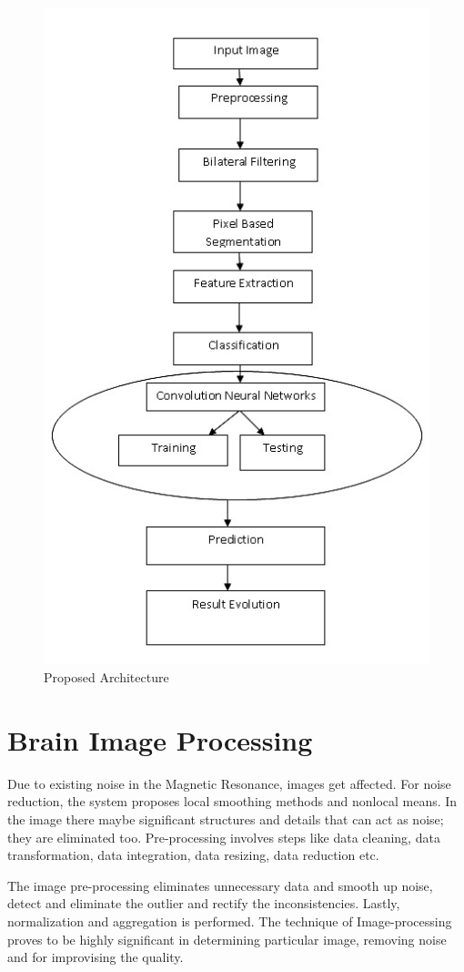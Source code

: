 \documentclass[a4paper, 12pt]{report}
\begin{document}
\begin{spacing}{1.5}
\begin{figure}[h!]
\centering
\includegraphics[width=0.8\linewidth]{sysarch.jpg}
\caption{Proposed Architecture}
\end{figure}


\newpage
\section{Brain Image Processing}

\par Due to existing noise in the Magnetic Resonance, images get affected. For noise reduction, the system proposes local smoothing methods and nonlocal means. In the image there maybe significant structures and details that can act as noise; they are eliminated too. Pre-processing involves steps like data cleaning, data transformation, data integration, data resizing, data reduction etc. 
\par The image pre-processing eliminates unnecessary data and smooth up noise, detect and eliminate the outlier and rectify the inconsistencies. Lastly, normalization and aggregation is performed. The technique of Image-processing proves to be highly significant in determining particular image, removing noise and for improvising the quality.


\end{spacing}
\end{document}
